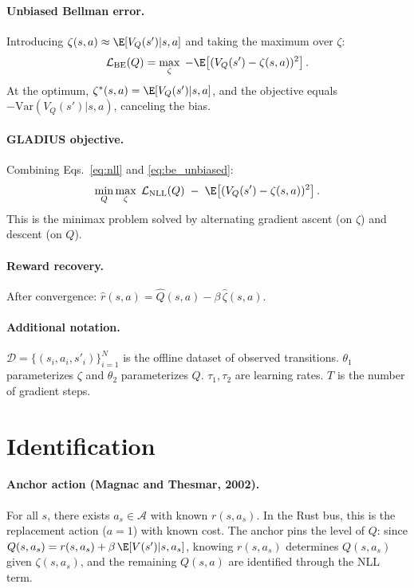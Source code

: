 \documentclass[11pt]{article}
\begin{document}
\paragraph{Unbiased Bellman error.} Introducing $\zeta(s,a) \approx \E[V_Q(s')|s,a]$ and taking the maximum over $\zeta$:
\begin{equation}
\label{eq:be_unbiased}
\mathcal{L}_{\text{BE}}(Q) = \max_\zeta \; -\E\!\left[(V_Q(s') - \zeta(s,a))^2\right].
\end{equation}
At the optimum, $\zeta^*(s,a) = \E[V_Q(s')|s,a]$, and the objective equals $-\text{Var}(V_Q(s')|s,a)$, canceling the bias.

\paragraph{GLADIUS objective.} Combining Eqs.~\eqref{eq:nll} and \eqref{eq:be_unbiased}:
\begin{equation}
\label{eq:gladius}
\min_Q \max_\zeta \; \mathcal{L}_{\text{NLL}}(Q) \;-\; \E\!\left[(V_Q(s') - \zeta(s,a))^2\right].
\end{equation}
This is the minimax problem solved by alternating gradient ascent (on $\zeta$) and descent (on $Q$).

\paragraph{Reward recovery.} After convergence: $\hat{r}(s,a) = \hat{Q}(s,a) - \beta\,\hat{\zeta}(s,a)$.

\paragraph{Additional notation.} $\mathcal{D} = \{(s_i, a_i, s'_i)\}_{i=1}^N$ is the offline dataset of observed transitions. $\theta_1$ parameterizes $\zeta$ and $\theta_2$ parameterizes $Q$. $\tau_1, \tau_2$ are learning rates. $T$ is the number of gradient steps.


\section{Identification}

\paragraph{Anchor action (Magnac and Thesmar, 2002).} For all $s$, there exists $a_s \in \mathcal{A}$ with known $r(s, a_s)$. In the Rust bus, this is the replacement action ($a = 1$) with known cost. The anchor pins the level of $Q$: since $Q(s,a_s) = r(s,a_s) + \beta\,\E[V(s')|s,a_s]$, knowing $r(s,a_s)$ determines $Q(s,a_s)$ given $\zeta(s,a_s)$, and the remaining $Q(s,a)$ are identified through the NLL term.
\end{document}
